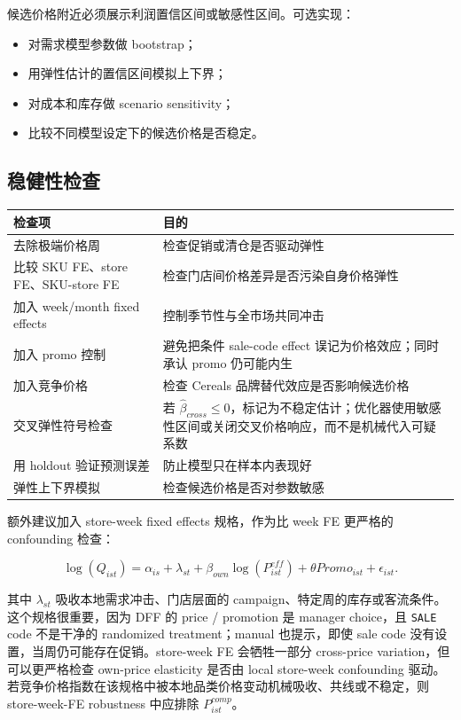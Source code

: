 \documentclass[UTF8,11pt,a4paper,fontset=none]{ctexart}
\begin{document}
候选价格附近必须展示利润置信区间或敏感性区间。可选实现：

\begin{itemize}
  \item 对需求模型参数做 bootstrap；
  \item 用弹性估计的置信区间模拟上下界；
  \item 对成本和库存做 scenario sensitivity；
  \item 比较不同模型设定下的候选价格是否稳定。
\end{itemize}

\subsection{稳健性检查}

\begin{tabularx}{\textwidth}{L{4.0cm}Y}
\toprule
检查项 & 目的 \\
\midrule
去除极端价格周 & 检查促销或清仓是否驱动弹性 \\
比较 SKU FE、store FE、SKU-store FE & 检查门店间价格差异是否污染自身价格弹性 \\
加入 week/month fixed effects & 控制季节性与全市场共同冲击 \\
加入 promo 控制 & 避免把条件 sale-code effect 误记为价格效应；同时承认 promo 仍可能内生 \\
加入竞争价格 & 检查 Cereals 品牌替代效应是否影响候选价格 \\
交叉弹性符号检查 & 若 $\widehat{\beta}_{cross}\le 0$，标记为不稳定估计；优化器使用敏感性区间或关闭交叉价格响应，而不是机械代入可疑系数 \\
用 holdout 验证预测误差 & 防止模型只在样本内表现好 \\
弹性上下界模拟 & 检查候选价格是否对参数敏感 \\
\bottomrule
\end{tabularx}

额外建议加入 store-week fixed effects 规格，作为比 week FE 更严格的 confounding 检查：

\begin{equation}
\log(Q_{ist}) =
\alpha_{is}
+
\lambda_{st}
+
\beta_{own}\log(P^{eff}_{ist})
+
\theta Promo_{ist}
+
\epsilon_{ist}.
\end{equation}

其中 $\lambda_{st}$ 吸收本地需求冲击、门店层面的 campaign、特定周的库存或客流条件。这个规格很重要，因为 DFF 的 price / promotion 是 manager choice，且 \texttt{SALE} code 不是干净的 randomized treatment；manual 也提示，即使 sale code 没有设置，当周仍可能存在促销。store-week FE 会牺牲一部分 cross-price variation，但可以更严格检查 own-price elasticity 是否由 local store-week confounding 驱动。若竞争价格指数在该规格中被本地品类价格变动机械吸收、共线或不稳定，则 store-week-FE robustness 中应排除 $P^{comp}_{ist}$。
\end{document}
